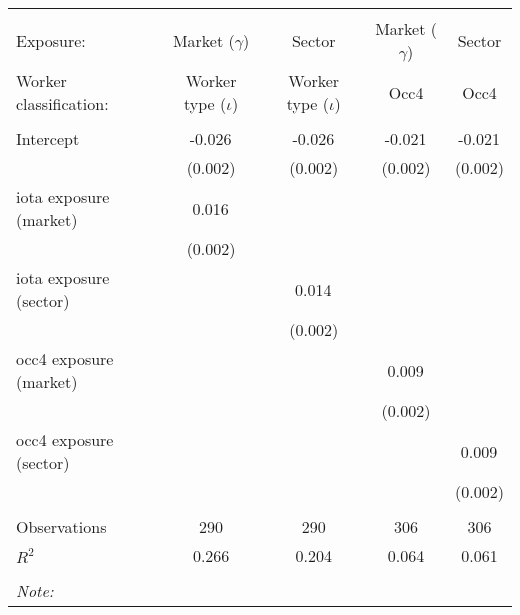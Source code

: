 \begin{tabular}{@{\extracolsep{5pt}}lcccc}
\\[-1.8ex]\hline
\hline \\[-1.8ex]
\hline \\[-1.8ex]
 Exposure: & Market ($\gamma$) & Sector & Market ($\gamma$) & Sector \\
 Worker classification: & Worker type ($\iota$) & Worker type ($\iota$) & Occ4 & Occ4 \\
 \hline &  &  &  &  \\
 Intercept & -0.026$^{}$ & -0.026$^{}$ & -0.021$^{}$ & -0.021$^{}$ \\
  & (0.002) & (0.002) & (0.002) & (0.002) \\
 iota exposure (market) & 0.016$^{}$ & & & \\
  & (0.002) & & & \\
 iota exposure (sector) & & 0.014$^{}$ & & \\
  & & (0.002) & & \\
 occ4 exposure (market) & & & 0.009$^{}$ & \\
  & & & (0.002) & \\
 occ4 exposure (sector) & & & & 0.009$^{}$ \\
  & & & & (0.002) \\
\hline \\[-1.8ex]
 Observations & 290 & 290 & 306 & 306 \\
 $R^2$ & 0.266 & 0.204 & 0.064 & 0.061 \\
\hline
\hline \\[-1.8ex]
\textit{Note:}\end{tabular}